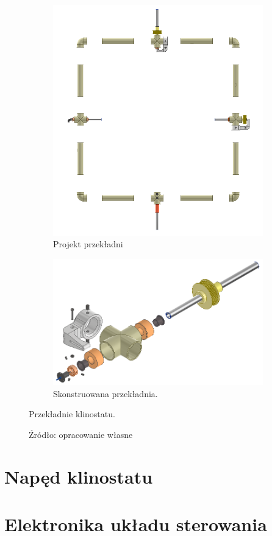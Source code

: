\begin{figure}
	\centering
	
	\begin{subfigure}[b]{.49\textwidth}
		\centering
		\includegraphics[width=\textwidth]{rama_40_aisass}
		\caption{Projekt przekładni} 
		\label{fig:projekt przekładni}
	\end{subfigure}
	\hfill%
	\begin{subfigure}[b]{.49\textwidth}
		\centering
		\includegraphics[width=\textwidth]{2_diss}
		\caption{Skonstruowana przekładnia.} 
		
		\label{fig:gotowa przekładnia}
	\end{subfigure}

	\caption{Przekładnie klinostatu.}
	\caption*{Źródło: opracowanie własne}
	
\end{figure}



\section{Napęd klinostatu}

\section{Elektronika układu sterowania}